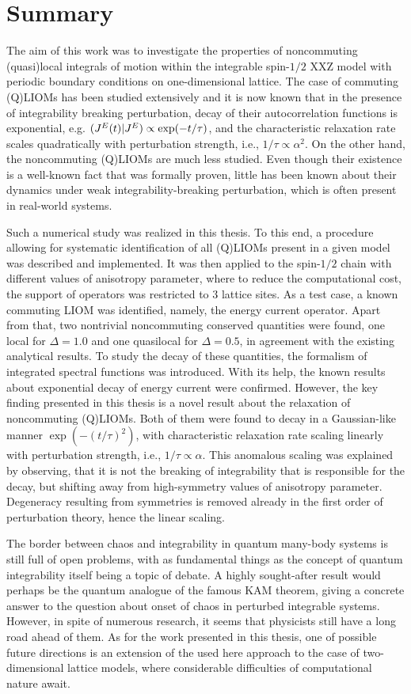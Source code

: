 \chapter{Summary}
\thispagestyle{chapterBeginStyle}
The aim of this work was to investigate the properties of noncommuting (quasi)local integrals of
motion within the integrable spin-\(1/2\) XXZ model with periodic boundary conditions
on one-dimensional lattice. The case of commuting (Q)LIOMs has been studied extensively
and it is now known that in the presence of integrability breaking perturbation, 
decay of their autocorrelation functions is exponential, e.g. \((J^E(t) | J^E) \propto \exp(-t/\tau)\),
and the characteristic relaxation rate scales quadratically with perturbation strength, i.e., \(1/\tau \propto \alpha^2\).
On the other hand, the noncommuting
(Q)LIOMs are much less studied. Even though their existence is a well-known fact that was
formally proven,  little has been known about their dynamics under weak integrability-breaking
perturbation, which is often present in real-world systems.

Such a numerical study was realized in this thesis. To this end, a procedure allowing for 
systematic identification of all (Q)LIOMs present in a given model was described and implemented.
It was then applied to the spin-\(1/2\) chain with different values of anisotropy parameter,
where to reduce the computational cost, the support of operators was restricted to \(3\) lattice sites.
As a test case, a known commuting LIOM was identified, namely, the energy current operator.
Apart from that, two nontrivial noncommuting conserved  quantities were found, one local for
\(\Delta = 1.0\) and one quasilocal for \(\Delta=0.5\), in agreement with the existing analytical
results. To study the decay of these quantities, the formalism of integrated spectral
functions was introduced. With its help, the known results about exponential
decay of energy current were confirmed. However, the key finding presented in this thesis 
is a novel result about the relaxation of noncommuting (Q)LIOMs. Both of them were found
to decay in a Gaussian-like manner \( \exp(-(t/\tau)^2)\), with characteristic relaxation
rate scaling linearly with perturbation strength, i.e., \(1/\tau \propto \alpha\).
This anomalous scaling was explained by observing, that
it is not the breaking of integrability that is responsible for the decay, but shifting
away from high-symmetry values of anisotropy parameter. Degeneracy resulting from
symmetries is removed already in the first order of perturbation theory, hence the linear scaling.

The border between chaos and integrability in quantum many-body systems is still full
of open problems, with as fundamental things as the concept of quantum integrability itself
being a topic of debate. A highly sought-after result would perhaps be the quantum analogue
of the famous KAM theorem, giving a concrete answer to the question about onset of chaos
in perturbed integrable systems. However, in spite of numerous research, it seems that
physicists still have a long road ahead of them. As for the work presented in this thesis,
one of possible future directions is an extension of the used here approach to the
case of two-dimensional lattice models, where considerable difficulties of computational
nature await.